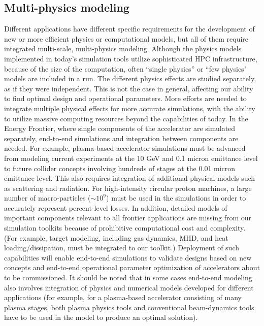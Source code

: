 \subsection{Multi-physics modeling}
 Different applications have different specific
requirements for the development of new or more efficient physics
or computational models, but all of them require integrated
multi-scale, multi-physics modeling.  
Although the physics models implemented in today's simulation tools utilize sophisticated HPC infrastructure, because of the size of the computation, often ``single physics'' or ``few physics" models are included in a run. 
The different physics effects are studied separately, as if they were independent.  
This is not the case in general, affecting our ability to find optimal design and operational parameters.  
More efforts are needed to integrate multiple physical effects for more accurate simulations, with the ability to utilize massive computing resources beyond the capabilities of today. 
   In the Energy Frontier, where single components of the accelerator are simulated separately, end-to-end simulations and integration between components are needed.  For example, plasma-based accelerator simulations must be advanced from modeling current experiments at the 10 GeV and 0.1 micron emittance level to future collider concepts involving hundreds of stages at the 0.01 micron emittance level. 
This also requires integration of additional physical models such as scattering and radiation. For high-intensity circular proton machines, a large number of macro-particles ($\sim 10^9$) must be used in the simulations in order to accurately represent percent-level losses. In addition, detailed models of important components relevant to all frontier applications are missing from our simulation toolkits because of prohibitive computational cost and complexity.
(For example, target modeling, including gas dynamics, MHD, and heat loading/dissipation, must be integrated to our toolkit.) 
Deployment of such capabilities
will enable end-to-end simulations to validate designs based on
new concepts and end-to-end operational parameter optimization of
accelerators about to be commissioned.  It should be noted that
in some cases end-to-end modeling also involves integration of physics
and numerical models developed for different applications (for
example, for a plasma-based accelerator consisting of many plasma
stages, both plasma physics tools and conventional beam-dynamics
tools have to be used in the model to produce an optimal
solution).


